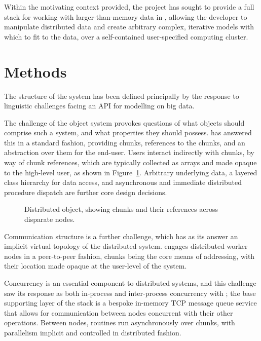 \documentclass[letterpaper, inpress]{jds} %
\begin{document}
Within the motivating context provided, the  project has sought to provide a full stack for working with larger-than-memory data in , allowing the developer to manipulate distributed data and create arbitrary complex, iterative models with which to fit to the data, over a self-contained user-specified computing cluster.

\section{Methods}

The structure of the  system has been defined principally by the response to linguistic challenges facing an API for modelling on big data.

The challenge of the object system provokes questions of what objects should comprise such a system, and what properties they should possess.
 has answered this in a standard fashion, providing chunks, references to the chunks, and an abstraction over them for the end-user. Users interact indirectly with chunks, by way of chunk references, which are typically collected as arrays and made opaque to the high-level user, as shown in Figure~\ref{fig:distobj}. Arbitrary underlying data, a layered class hierarchy for data access, and asynchronous and immediate distributed procedure dispatch are further core design decisions.

\begin{figure}[ht]
\begin{center}
    
\caption{Distributed object, showing chunks and their references across disparate nodes.}
\label{fig:distobj}
\end{center}
\end{figure}

Communication structure is a further challenge, which has as its answer an implicit virtual topology of the distributed system.
 engages distributed worker nodes in a peer-to-peer fashion, chunks being the core means of addressing, with their location made opaque at the user-level of the system.

Concurrency is an essential component to distributed systems, and this challenge saw its response as both in-process and inter-process concurrency with ; the base supporting layer of the  stack is a bespoke in-memory TCP message queue service that allows for communication between nodes concurrent with their other operations.
Between nodes, routines run asynchronously over chunks, with parallelism implicit and controlled in distributed fashion.
\end{document}
